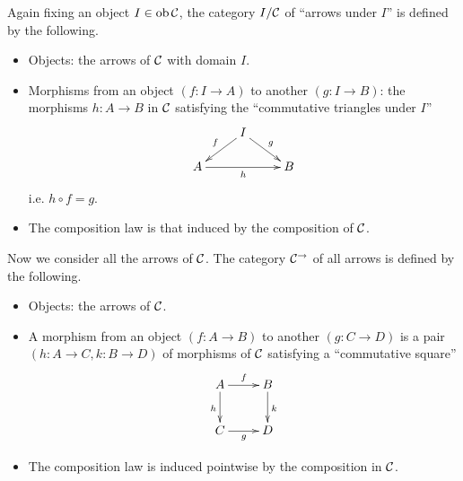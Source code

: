 \begin{exam}
  Again fixing an object $I\in\operatorname{ob}{\cal C}$, the category $I/{\cal C}$ of ``arrows under $I$'' is defined by the following.
  \begin{itemize}
    \item Objects: the arrows of ${\cal C}$ with domain $I$.
    \item Morphisms from an object $(f\colon I\to A)$ to another $(g\colon I\to B)$:
               the morphisms $h\colon A\to B$ in ${\cal C}$ satisfying the ``commutative triangles under $I$''
               \begin{displaymath}
                 \xymatrix@R=0.5cm{
                    &I\ar[dl]_{f}\ar[dr]^{g}& \\
                    A\ar[rr]_{h} && B   }
               \end{displaymath}
               i.e.  $h \circ f = g$.
    \item   The composition law is that induced by the composition of ${\cal C}$.
  \end{itemize}
\end{exam}

\begin{exam}
  Now we consider all the arrows of ${\cal C}$. The category ${\cal C}^{\to}$  of all arrows is defined by the following. 
  \begin{itemize}
    \item Objects: the arrows of ${\cal C}$.
    \item A morphism from an object $(f\colon A \to B)$ to another $(g\colon C \to D)$ is a pair $(h\colon A\to C, k\colon B\to D)$ of morphisms of ${\cal C}$ satisfying a ``commutative square''
               \begin{displaymath}
                 \xymatrix{
                    A\ar[d]_{h}\ar[r]^{f} & B\ar[d]^{k} \\
                    C\ar[r]_{g}&D                }
               \end{displaymath}
    \item   The composition law is induced pointwise by the composition in ${\cal C}$.
  \end{itemize}
\end{exam}

